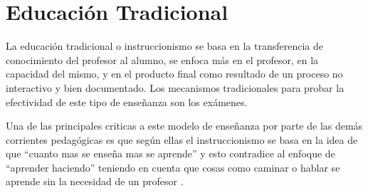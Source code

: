 \section{Educación Tradicional}

La educación tradicional o instruccionismo se basa en la transferencia de 
conocimiento del profesor al alumno, se enfoca más en el profesor, en la 
capacidad del mismo, y en el producto final como resultado de un proceso 
no interactivo y bien documentado\cite{igi:instructionism}. Los mecanismos 
tradicionales para probar la efectividad de este tipo de enseñanza son los exámenes.




Una de las principales criticas a este modelo de enseñanza por parte de las
demás corrientes pedagógicas es que según ellas el instruccionismo se basa en la
idea de que  \enquote{cuanto mas se enseña mas se aprende} y esto contradice al
enfoque de \enquote{aprender haciendo} teniendo en cuenta que cosas como caminar
o hablar se aprende sin la necesidad de un profesor
\cite{ackoff:education,johnson2005instructionism}. 


